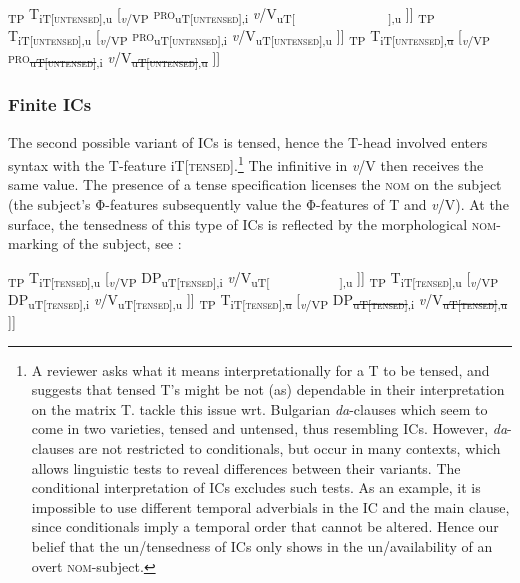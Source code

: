 \documentclass[output=paper,colorlinks,citecolor=brown,
modfonts,newtxmath
]{langscibook}
\begin{document}
\ea\label{ex:nonfinite}
\ea {[}\textsubscript{TP} T\textsubscript{iT[\textsc{untensed}],u\textPhi[~~]} [\textsubscript{\textit{v}/VP} \textsc{pro}\textsubscript{uT[\textsc{untensed}],i\textPhi[~~~]} \textit{v}/V\textsubscript{uT[~~~~~~~~~~~~~~~~],u\textPhi[~~~]} ]] 
\ex {[}\textsubscript{TP} T\textsubscript{iT[\textsc{untensed}],u\textPhi[Φ]} [\textsubscript{\textit{v}/VP} \textsc{pro}\textsubscript{uT[\textsc{untensed}],i\textPhi[Φ]} \textit{v}/V\textsubscript{uT[\textsc{untensed}],u\textPhi[Φ]} ]] 
\ex {[}\textsubscript{TP} T\textsubscript{iT[\textsc{untensed}],\sout{u\textPhi[Φ]}} [\textsubscript{\textit{v}/VP} \textsc{pro}\textsubscript{\sout{uT[\textsc{untensed}]},i\textPhi[Φ]} \textit{v}/V\textsubscript{\sout{uT[\textsc{untensed}]},\sout{u\textPhi[Φ]}} ]] 
\z
\z


\subsubsection{Finite ICs}\label{sec:nom_proposal_finite}

The second possible variant of ICs is tensed, hence the T-head involved enters syntax with the T-feature iT[\textsc{tensed}].\footnote{A reviewer asks what it means interpretationally for a T to be tensed, and suggests that tensed T's might be not (as) dependable in their interpretation on the matrix T. \citet{KrapovaPetkov1999} tackle this issue wrt. Bulgarian \textit{da}-clauses which seem to come in two varieties, tensed and untensed, thus resembling ICs. However, \textit{da}-clauses are not restricted to conditionals, but occur in many contexts, which allows linguistic tests to reveal differences between their variants. The conditional interpretation of ICs excludes such tests. As an example, it is impossible to use different temporal adverbials in the IC and the main clause, since conditionals imply a temporal order that cannot be altered. Hence our belief that the un/tensedness of ICs only shows in the un/availability of an overt \textsc{nom}-subject.} The infinitive in \textit{v}/V then receives the same value. The presence of a tense specification licenses the \textsc{nom} on the subject (the subject's Φ-features subsequently value the Φ-features of T and \textit{v}/V). At the surface, the tensedness of this type of ICs is reflected by the morphological \textsc{nom}-marking of the subject, see :

\ea\label{ex:finite}
\ea {[}\textsubscript{TP} T\textsubscript{iT[\textsc{tensed}],u\textPhi[~~]} [\textsubscript{\textit{v}/VP} DP\textsubscript{uT[\textsc{tensed}],i\textPhi[Φ]} \textit{v}/V\textsubscript{uT[~~~~~~~~~~~~],u\textPhi[~~~]} ]]
\ex {[}\textsubscript{TP} T\textsubscript{iT[\textsc{tensed}],u\textPhi[Φ]} [\textsubscript{\textit{v}/VP} DP\textsubscript{uT[\textsc{tensed}],i\textPhi[Φ]} \textit{v}/V\textsubscript{uT[\textsc{tensed}],u\textPhi[Φ]} ]] 
\ex {[}\textsubscript{TP} T\textsubscript{iT[\textsc{tensed}],\sout{u\textPhi[Φ]}} [\textsubscript{\textit{v}/VP} DP\textsubscript{\sout{uT[\textsc{tensed}]},i\textPhi[Φ]} \textit{v}/V\textsubscript{\sout{uT[\textsc{tensed}]},\sout{u\textPhi[Φ]}} ]] 
\z
\z
\end{document}
